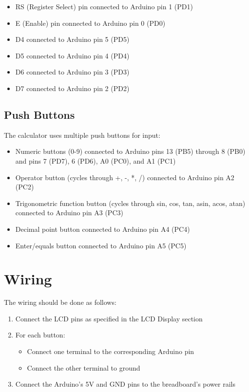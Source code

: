\documentclass{article}
\begin{document}
\begin{itemize}
    \item RS (Register Select) pin connected to Arduino pin 1 (PD1)
    \item E (Enable) pin connected to Arduino pin 0 (PD0)
    \item D4 connected to Arduino pin 5 (PD5)
    \item D5 connected to Arduino pin 4 (PD4)
    \item D6 connected to Arduino pin 3 (PD3)
    \item D7 connected to Arduino pin 2 (PD2)
\end{itemize}

\subsection{Push Buttons}

The calculator uses multiple push buttons for input:
\begin{itemize}
    \item Numeric buttons (0-9) connected to Arduino pins 13 (PB5) through 8 (PB0) and pins 7 (PD7), 6 (PD6), A0 (PC0), and A1 (PC1)
    \item Operator button (cycles through +, -, *, /) connected to Arduino pin A2 (PC2)
    \item Trigonometric function button (cycles through sin, cos, tan, asin, acos, atan) connected to Arduino pin A3 (PC3)
    \item Decimal point button connected to Arduino pin A4 (PC4)
    \item Enter/equals button connected to Arduino pin A5 (PC5)
\end{itemize}



\section{Wiring}

The wiring should be done as follows:
\begin{enumerate}
    \item Connect the LCD pins as specified in the LCD Display section
    \item For each button:
        \begin{itemize}
            \item Connect one terminal to the corresponding Arduino pin
            \item Connect the other terminal to ground
        \end{itemize}
    \item Connect the Arduino's 5V and GND pins to the breadboard's power rails
\end{enumerate}
\end{document}
